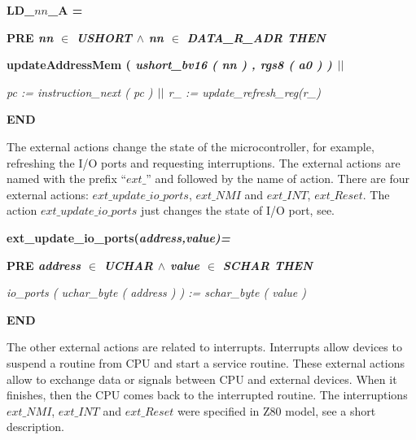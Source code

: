 \documentclass[a4paper]{llncs}
\begin{document}
\bf LD\_\(nn\)\_A  \rm =

\hspace*{0.20in}\bf PRE \it nn $\in$ \it USHORT\hspace*{0.15in} $\land$ \hspace*{0.10in}\it nn\hspace*{0.10in} $\in$  \it DATA\_R\_ADR \hspace*{0.10in}\bf THEN

\hspace*{0.20in}\bf updateAddressMem \rm ( \it ushort\_bv16 \rm ( \it nn \rm ) \rm , \it rgs8 \rm ( \it a0 \rm )
\rm )  $\mbox{$\mid\mid$}$

\hspace*{0.20in}\it pc \rm := \it instruction\_next \rm ( \it pc \rm )  $\mbox{$\mid\mid$}$  \it r\_ \rm := \it update\_refresh\_reg\rm (\it r\_\rm )

\hspace*{0.00in}\bf END\rm 

The external actions change the state of the microcontroller, for
example, refreshing the I/O ports and requesting interruptions. The
external actions are named with the prefix ``$ext\_$'' and followed by
the name of action. There are four external actions: $ext\_update\_io\_ports$, $ext\_NMI$ and
$ext\_INT$, $ext\_Reset$. The action $ext\_update\_io\_ports$
just changes the state of I/O port,  see. 

\hspace*{0.00in}\bf ext\_update\_io\_ports\rm (\it address\rm ,\it value\rm )\rm =

\hspace*{0.20in}\bf PRE \it address  $\in$  \it UCHAR  $\land$ \hspace*{0.10in}\it value  $\in$  \it SCHAR \bf THEN

\hspace*{0.20in}\it io\_ports \rm ( \it uchar\_byte \rm ( \it address \rm ) \rm ) \rm := \it schar\_byte \rm ( \it
value \rm )

\hspace*{0.00in}\bf END\rm

The other external actions are related to interrupts. Interrupts allow
devices to suspend a routine from CPU and start a service routine.
These external actions allow to exchange data or signals between CPU and external
devices. When it finishes, then the CPU comes back to the interrupted
routine. The interruptions  $ext\_NMI$, $ext\_INT$ and $ext\_Reset$
were specified in Z80 model, see a short description. 
\end{document}
